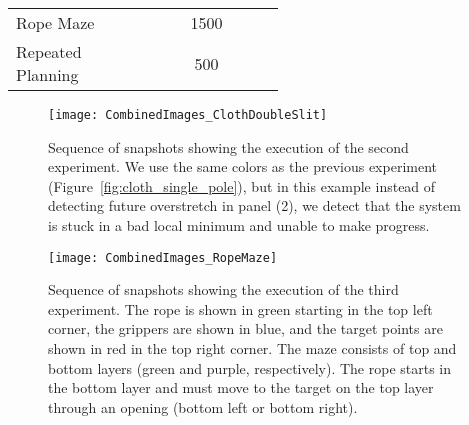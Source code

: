 \begin{table*}[t]
\begin{tabular}{lccccc|cccc}
Rope Maze                           & \parbox{0.37in}{} & \parbox{0.37in}{} & \parbox{0.4in}{} & \parbox{0.4in}{} & \parbox{0.3in}{} & 1500 & \parbox{0.5in}{} & \parbox{0.4in}{} & \parbox{0.3in}{\smallskip{}\smallskip} \\

\parbox{0.6in}{Repeated\\Planning} & \parbox{0.37in}{}  & \parbox{0.37in}{} & \parbox{0.4in}{} & \parbox{0.4in}{} & \parbox{0.3in}{} &  500 & \parbox{0.5in}{} & \parbox{0.4in}{} & \parbox{0.3in}{\smallskip{}\smallskip} \\
\hline
\end{tabular}
\end{table*}




\begin{figure*}[t]
    \centering
    \texttt{[image: CombinedImages\_ClothDoubleSlit]}
    \vspace{-0.2in}
    \caption{Sequence of snapshots showing the execution of the second experiment. We use the same colors as the previous experiment (Figure~\ref{fig:cloth_single_pole}), but in this example instead of detecting future overstretch in panel (2), we detect that the system is stuck in a bad local minimum and unable to make progress.}
    \label{fig:cloth_double_slit}
\end{figure*}


\begin{figure*}[t]
    \centering
    \texttt{[image: CombinedImages\_RopeMaze]}
    \vspace{-2in}
    \caption{Sequence of snapshots showing the execution of the third experiment. The rope is shown in green starting in the top left corner, the grippers are shown in blue, and the target points are shown in red in the top right corner. The maze consists of top and bottom layers (green and purple, respectively). The rope starts in the bottom layer and must move to the target on the top layer through an opening (bottom left or bottom right).}
    \label{fig:rope_maze}
\end{figure*}

